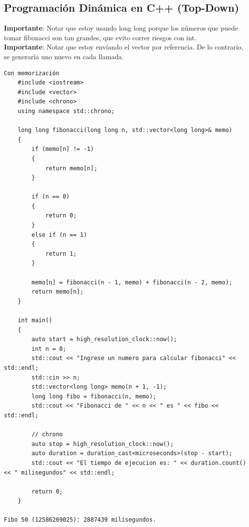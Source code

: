 \documentclass[10pt,a4paper]{article}
\begin{document}
\subsection*{Programación Dinámica en C++ (Top-Down)}
\label{subsec:top_down_programacion_dinamica}
\textbf{Importante}: Notar que estoy usando long long porque los números que puede tomar fibonacci son tan grandes, que evito correr riesgos con int. \\
\textbf{Importante}: Notar que estoy envíando el vector por referencia. De lo contrario, se generaría uno nuevo en cada llamada. \\
\begin{lstlisting}
Con memorización
    #include <iostream>
    #include <vector>
    #include <chrono>
    using namespace std::chrono;

    long long fibonacci(long long n, std::vector<long long>& memo)
    {
        if (memo[n] != -1)
        {
            return memo[n];
        }

        if (n == 0)
        {
            return 0;
        }
        else if (n == 1)
        {
            return 1;
        }

        memo[n] = fibonacci(n - 1, memo) + fibonacci(n - 2, memo);
        return memo[n];
    }

    int main()
    {
        auto start = high_resolution_clock::now();
        int n = 0;
        std::cout << "Ingrese un numero para calcular fibonacci" << std::endl;
        std::cin >> n;
        std::vector<long long> memo(n + 1, -1);
        long long fibo = fibonacci(n, memo);
        std::cout << "Fibonacci de " << n << " es " << fibo << std::endl;

        // chrono
        auto stop = high_resolution_clock::now();
        auto duration = duration_cast<microseconds>(stop - start);
        std::cout << "El tiempo de ejecucion es: " << duration.count() << " milisegundos" << std::endl;

        return 0;
    }
    
Fibo 50 (12586269025): 2887439 milisegundos.
\end{lstlisting}
\end{document}
